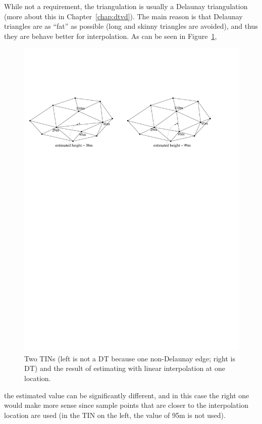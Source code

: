 While not a requirement, the triangulation is usually a Delaunay triangulation (more about this in Chapter~\ref{chap:dtvd}).
The main reason is that Delaunay triangles are as ``fat'' as possible (long and skinny triangles are avoided), and thus they are behave better for interpolation.
As can be seen in Figure~\ref{fig:whydt},
\begin{figure}
  \centering
  \includegraphics[width=\linewidth]{figs/whydt}
  \caption{Two TINs (left is not a DT because one non-Delaunay edge; right is DT) and the result of estimating with linear interpolation at one location.}
\label{fig:whydt}
\end{figure}
the estimated value can be significantly different, and in this case the right one would make more sense since sample points that are closer to the interpolation location are used (in the TIN on the left, the value of 95m is not used).

